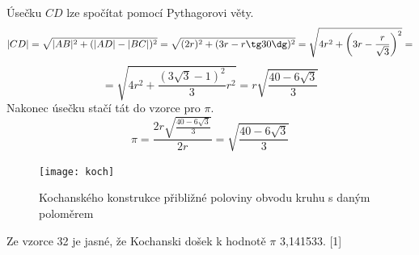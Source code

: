 \documentclass[rocnikovka]{gzwroc} %
\begin{document}
Úsečku $CD$ lze spočítat pomocí Pythagorovi věty.
$$ |CD|=\sqrt{|AB|^2+(|AD|-|BC|)^2}=\sqrt{(2r)^2+(3r-r\tg 30\dg)^2} = \sqrt{4r^2+\left(3r-\frac{r}{\sqrt{3}}\right)^2}= $$
\begin{equation}
=\sqrt{4r^2+\frac{(3\sqrt{3}-1)^2}{3}r^2} = r\sqrt{\frac{40-6\sqrt{3}}{3}}
\end{equation}
Nakonec úsečku stačí tát do vzorce pro $\pi$.
\begin{equation}
\pi=\frac{2r\sqrt{\frac{40-6\sqrt{3}}{3}}}{2r}=\sqrt{\frac{40-6\sqrt{3}}{3}}
\end{equation}
\begin{figure}[!ht]
\texttt{[image: koch]}
\caption{Kochanského konstrukce přibližné poloviny obvodu kruhu s daným poloměrem}
\label{fig:kruh}
\end{figure}
Ze vzorce 32 je jasné, že Kochanski došek k hodnotě $\pi$ 3,141533. [1]
\end{document}
